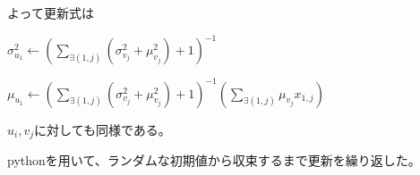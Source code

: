 \documentclass[a4j]{jarticle}
\let \ds \displaystyle
\begin{document}
よって更新式は


$\ds \sigma^2_{u_1} \leftarrow \left( \sum_{\exists(1,j)} \left(\sigma^2_{v_j}+\mu^2_{v_j} \right) + 1 \right)^{-1}$


$\ds \mu_{u_1} \leftarrow \left( \sum_{\exists(1,j)} \left(\sigma^2_{v_j}+\mu^2_{v_j} \right) + 1 \right)^{-1}\left( \sum_{\exists(1,j)} \mu_{v_j}x_{1,j} \right)$


$u_i,v_j$に対しても同様である。

pythonを用いて、ランダムな初期値から収束するまで更新を繰り返した。

\newpage 


\end{document}
